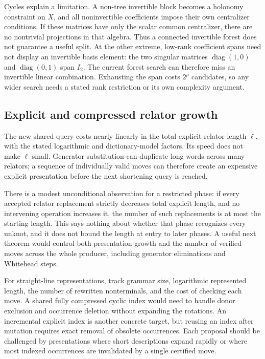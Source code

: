 Cycles explain a limitation. A non-tree invertible block becomes a
holonomy constraint on $X$, and all noninvertible coefficients impose
their own centralizer conditions. If these matrices have only the scalar
common centralizer, there are no nontrivial projections in that algebra.
Thus a connected invertible forest does not guarantee a useful split.
At the other extreme, low-rank coefficient spans need not display an
invertible basis element: the two singular matrices
$\operatorname{diag}(1,0)$ and $\operatorname{diag}(0,1)$ span $I_2$.
The current forest search can therefore miss an invertible linear
combination. Exhausting the span costs $2^\rho$ candidates, so any wider
search needs a stated rank restriction or its own complexity argument.

\subsection{Explicit and compressed relator growth}

The new shared query costs nearly linearly in the total explicit relator
length $\ell$, with the stated logarithmic and dictionary-model factors.
Its speed does not make $\ell$ small. Generator substitution can duplicate
long words across many relators; a sequence of individually valid moves
can therefore create an expensive explicit presentation before the next
shortening query is reached.

There is a modest unconditional observation for a restricted phase: if
every accepted relator replacement strictly decreases total explicit
length, and no intervening operation increases it, the number of such
replacements is at most the starting length. This says nothing about
whether that phase recognizes every unknot, and it does not bound the
length at entry to later phases. A useful next theorem would control
both presentation growth and the number of verified moves across the
whole producer, including generator eliminations and Whitehead steps.

For straight-line representations, track grammar size, logarithmic
represented length, the number of rewritten nonterminals, and the cost
of checking each move. A shared fully compressed cyclic index would
need to handle donor exclusion and occurrence deletion without expanding
the rotations. An incremental explicit index is another concrete target,
but reusing an index after mutation requires exact removal of obsolete
occurrences. Each proposal should be challenged by presentations where
short descriptions expand rapidly or where most indexed occurrences are
invalidated by a single certified move.

